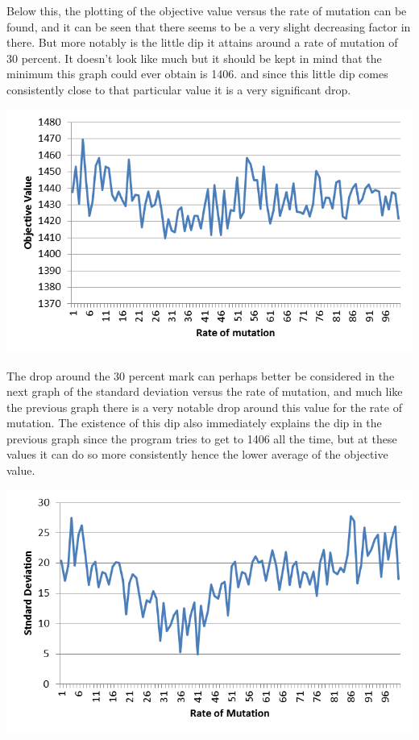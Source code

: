 \par
Below this, the plotting of the objective value versus the rate of mutation can be found, and it can be seen that there seems to be a very slight decreasing factor in there. But more notably is the little dip it attains around a rate of mutation of 30 percent. It doesn’t look like much but it should be kept in mind that the minimum this graph could ever obtain is 1406. and since this little dip comes consistently close to that particular value it is a very significant drop.
\par
\begin{centering}
\includegraphics[height=8cm]{OVRM}
\end{centering}
The drop around the 30 percent mark can perhaps better be considered in the next graph of the standard deviation versus the rate of mutation, and much like the previous graph there is a very notable drop around this value for the rate of mutation. The existence of this dip also immediately explains the dip in the previous graph since the program tries to get to 1406 all the time, but at these values it can do so more consistently hence the lower average of the objective value.
\par
\begin{centering}
\includegraphics[height=8cm]{SDRM}
\end{centering}
